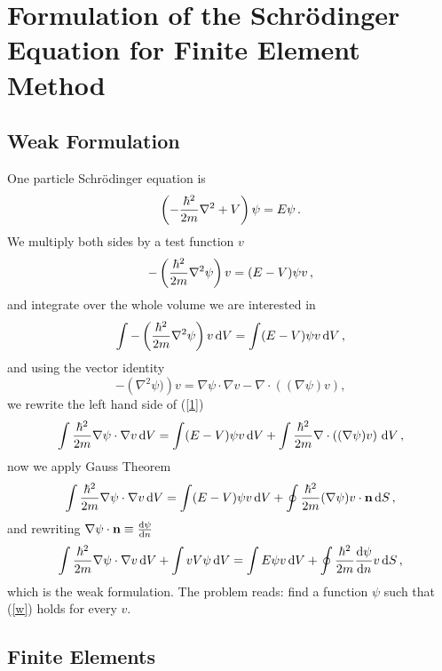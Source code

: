 \section{Formulation of the Schr\"odinger Equation for Finite Element Method}

\subsection{Weak Formulation}

One particle Schrödinger equation is 
\begin{equation*}
  \left(-{\hbar^2\over2m}\nabla^2 + V\right)\psi=E\psi\,.
\end{equation*}
We multiply both sides by a test function $v$
\begin{equation*}
  -\left({\hbar^2\over2m}\nabla^2\psi\right)v=(E-V)\psi v\,,
\end{equation*}
and integrate over the whole volume we are interested in 
\begin{equation}
  \int-\left({\hbar^2\over2m}\nabla^2\psi\right)v\,{\rm d} V=\int(E-V)\psi v\,{\rm d} V\,,  \label{1}
\end{equation}
and using the vector identity 
\begin{equation*}
  -\left(\nabla^2\psi)\right)v=\nabla \psi\cdot \nabla v - \nabla\cdot\left((\nabla \psi)v\right),
\end{equation*}
we rewrite the left hand side of (\ref{1})
\begin{equation*}
  \int{\hbar^2\over2m}\nabla\psi\cdot\nabla v\,{\rm d} V=\int(E-V)\psi v\,{\rm d} V+\int{\hbar^2\over2m}\nabla\cdot\left((\nabla \psi)v\right)\,{\rm d} V\,,
\end{equation*}
now we apply Gauss Theorem 
\begin{equation*}
  \int{\hbar^2\over2m}\nabla\psi\cdot\nabla v\,{\rm d} V=\int(E-V)\psi v\,{\rm d} V+\oint{\hbar^2\over2m}(\nabla \psi)v\cdot{\bf n}\,{\rm d} S\,,
\end{equation*}
and rewriting $\nabla\psi\cdot{\bf n}\equiv{{\rm d}\psi\over{\rm d}n}$
\begin{equation}
  \int{\hbar^2\over2m}\nabla\psi\cdot\nabla v\,{\rm d} V+ \int vV\psi\,{\rm d} V = \int E\psi v\,{\rm d} V + \oint{\hbar^2\over2m}{{\rm d}\psi\over{\rm d}n}v\,{\rm d} S\,,  \label{w}
\end{equation}
which is the weak formulation. The problem reads: find a function $\psi$ such that (\ref{w}) holds for every $v$.

\subsection{Finite Elements}

